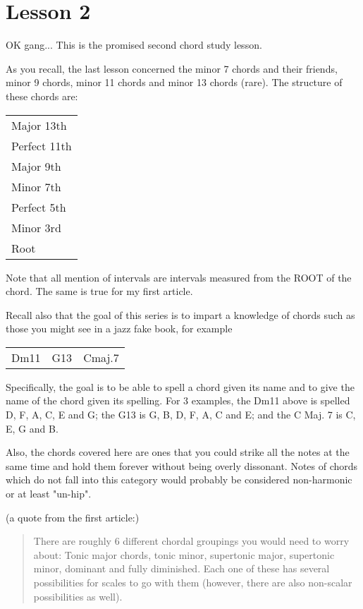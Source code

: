 \section{Lesson 2}

OK gang... This is the promised second chord study lesson.

As you recall, the last lesson concerned the minor 7 chords and their 
friends, minor 9 chords, minor 11 chords and minor 13 chords (rare).
The structure of these chords are:

\begin{center}
\begin{tabular}{ | l | }
	\hline
  Major 13th\\
  Perfect 11th\\
  Major 9th\\
  Minor 7th\\
  Perfect 5th\\
  Minor 3rd\\
  Root\\
  \hline
\end{tabular}
\end{center}

Note that all mention of intervals are intervals measured from the ROOT 
of the chord. The same is true for my first article.

Recall also that the goal of this series is to impart a knowledge of 
chords such as those you might see in a jazz fake book, for example

\begin{center}
\begin{tabular}{ c c c }
  Dm11 & G13 & Cmaj.7\\
\end{tabular}
\end{center}

Specifically, the goal is to be able to spell a chord given its name and 
to give the name of the chord given its spelling. For 3 examples, the 
Dm11 above is spelled D, F, A, C, E and G; the G13 is G, B, D, F, A, C 
and E; and the C Maj. 7 is C, E, G and B.

Also, the chords covered here are ones that you could strike all the 
notes at the same time and hold them forever without being overly 
dissonant. Notes of chords which do not fall into this category would 
probably be considered non-harmonic or at least "un-hip".

(a quote from the first article:)

\begin{quote}
There are roughly 6 different chordal groupings you would need to worry about:
Tonic major chords, tonic minor, supertonic major, supertonic minor, dominant
and fully diminished. Each one of these has several possibilities for scales
to go with them (however, there are also non-scalar possibilities as well).
\end{quote}

